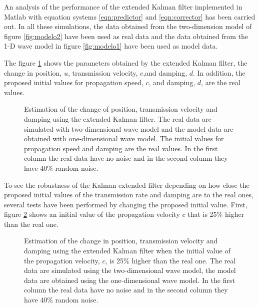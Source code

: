 \documentclass[12pt, a4paper]{article} %
\begin{document}
\setlength{\parskip}{0mm}

An analysis of the performance of the extended Kalman filter implemented in Matlab with equation systems \ref{eqn:predictor} and \ref{eqn:corrector} has been carried out. In all these simulations, the data obtained from the two-dimension model of figure \ref{fig:modelo2} have been used as real data and the data obtained from the 1-D wave model in figure \ref{fig:modelo1} have been used as model data.

\setlength{\parskip}{4mm}

The figure \ref{fig:kalman1} shows the parameters obtained by the extended Kalman filter, the change in position, $u$, transmission velocity, $c$,and damping, $d$. In addition, the proposed initial values for propagation speed, $c$, and damping, $d$, are the real values.

\begin{figure}[h!]
    \centering
    
    \caption{Estimation of the change of position, transmission velocity and damping using the extended Kalman filter. The real data are simulated with two-dimensional wave model and the model data are obtained with one-dimensional wave model. The initial values for propagation speed and damping are the real values. In the first column the real data have no noise and in the second column they have 40\% random noise.}
    \label{fig:kalman1}
\end{figure}

To see the robustness of the Kalman extended filter depending on how close the proposed initial values of the transmission rate and damping are to the real ones, several tests have been performed by changing the proposed initial value.  
First, figure \ref{fig:kalman1c} shows an initial value of the propagation velocity $c$ that is 25\% higher than the real one.

\begin{figure}[h!]
    \centering
    
    \caption{Estimation of the change in position, transmission velocity and damping using the extended Kalman filter when the initial value of the propagation velocity, $c$, is 25\% higher than the real one. The real data are simulated using the two-dimensional wave model, the model data are obtained using the one-dimensional wave model. In the first column the real data have no noise and in the second column they have 40\% random noise.}
    \label{fig:kalman1c}
\end{figure}
\end{document}

